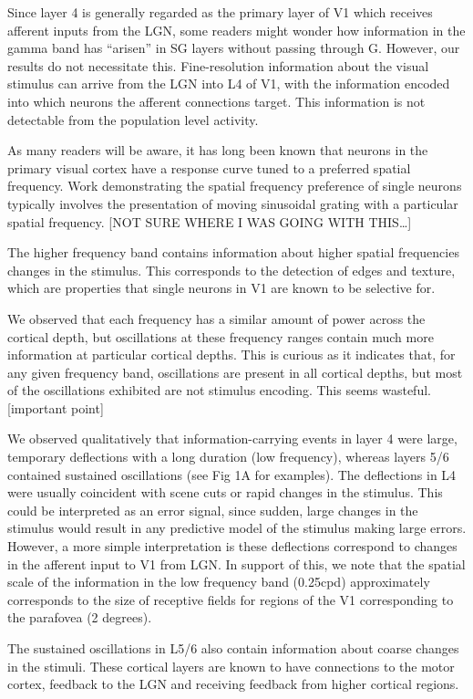 Since layer 4 is generally regarded as the primary layer of V1 which receives afferent inputs from the LGN, some readers might wonder how information in the gamma band has ``arisen'' in SG layers without passing through G. However, our results do not necessitate this. Fine-resolution information about the visual stimulus can arrive from the LGN into L4 of V1, with the information encoded into which neurons the afferent connections target. This information is not detectable from the population level activity. 

As many readers will be aware, it has long been known that neurons in the primary visual cortex have a response curve tuned to a preferred spatial frequency. Work demonstrating the spatial frequency preference of single neurons typically involves the presentation of moving sinusoidal grating with a particular spatial frequency. [NOT SURE WHERE I WAS GOING WITH THIS{\dots}]

The higher frequency band contains information about higher spatial frequencies changes in the stimulus. This corresponds to the detection of edges and texture, which are properties that single neurons in V1 are known to be selective for. 

We observed that each frequency has a similar amount of power across the cortical depth, but oscillations at these frequency ranges contain much more information at particular cortical depths. This is curious as it indicates that, for any given frequency band, oscillations are present in all cortical depths, but most of the oscillations exhibited are not stimulus encoding. This seems wasteful. [important point]

We observed qualitatively that information-carrying events in layer 4 were large, temporary deflections with a long duration (low frequency), whereas layers 5/6 contained sustained oscillations (see Fig 1A for examples). The deflections in L4 were usually coincident with scene cuts or rapid changes in the stimulus. This could be interpreted as an error signal, since sudden, large changes in the stimulus would result in any predictive model of the stimulus making large errors. However, a more simple interpretation is these deflections correspond to changes in the afferent input to V1 from LGN. In support of this, we note that the spatial scale of the information in the low frequency band (0.25cpd) approximately corresponds to the size of receptive fields for regions of the V1 corresponding to the parafovea (2 degrees).

The sustained oscillations in L5/6 also contain information about coarse changes in the stimuli. These cortical layers are known to have connections to the motor cortex, feedback to the LGN and receiving feedback from higher cortical regions. 

